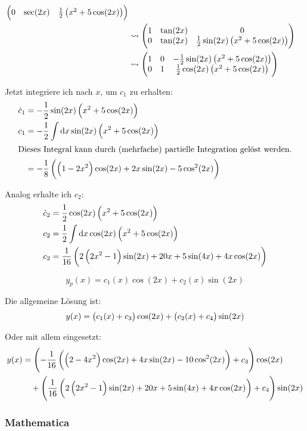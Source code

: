 \documentclass[11pt, ngerman]{article}
\begin{document}
\begin{align*}
\begin{pmatrix}
		0 & \sec(2x) & \frac 12 \del{x^2 + 5 \cos(2x)}
	\end{pmatrix} \\
	&\leadsto
	\begin{pmatrix}
		1 & \tan(2x) & 0 \\
		0 & \tan(2x) & \frac 12 \sin(2x) \del{x^2 + 5 \cos(2x)}
	\end{pmatrix} \\
	&\leadsto
	\begin{pmatrix}
		1 & 0 & -\frac 12 \sin(2x) \del{x^2 + 5 \cos(2x)} \\
		0 & 1 & \frac 12 \cos(2x) \del{x^2 + 5 \cos(2x)}
	\end{pmatrix}
\end{align*}

Jetzt integriere ich nach $x$, um $c_1$ zu erhalten:
\begin{align*}
	\dot c_1 &= -\frac 12 \sin(2x) \del{x^2 + 5 \cos(2x)} \\
	c_1 &= -\frac 12 \int \dif x \sin(2x) \del{x^2 + 5 \cos(2x)} \\
	\intertext{Dieses Integral kann durch (mehrfache) partielle Integration gelöst werden.}
		&= -\frac{1}{8} \left(\left(1-2 x^2\right) \cos (2 x)+2 x
   \sin (2 x)-5 \cos ^2(2 x)\right)
\end{align*}

Analog erhalte ich $c_2$:
\begin{align*}
	\dot c_2 &= \frac 12 \cos(2x) \del{x^2 + 5 \cos(2x)} \\
	c_2 &= \frac 12 \int \dif x \cos(2x) \del{x^2 + 5 \cos(2x)} \\
	c_2 &= \frac{1}{16} \left(2 \left(2 x^2-1\right) \sin (2 x)+20
   x+5 \sin (4 x)+4 x \cos (2 x)\right)
\end{align*}

\[
	y_p(x) = c_1(x) \cos(2x) + c_2(x) \sin(2x)
\]

Die allgemeine Lösung ist:
\[
	y(x) = \del{c_1(x) + c_3} \cos(2x) + \del{c_2(x) + c_4} \sin(2x)
\]

Oder mit allem eingesetzt:
\begin{align*}
	y(x) &=
	\del{-\frac{1}{16} \left(\left(2-4 x^2\right) \cos (2 x)+4 x
   \sin (2 x)-10 \cos ^2(2 x)\right) + c_3} \cos(2x) \\
	&\quad + \del{\frac{1}{16} \left(2 \left(2 x^2-1\right) \sin (2 x)+20
   x+5 \sin (4 x)+4 x \cos (2 x)\right) + c_4} \sin(2x)
\end{align*}

\subsubsection{Mathematica}
\end{document}
